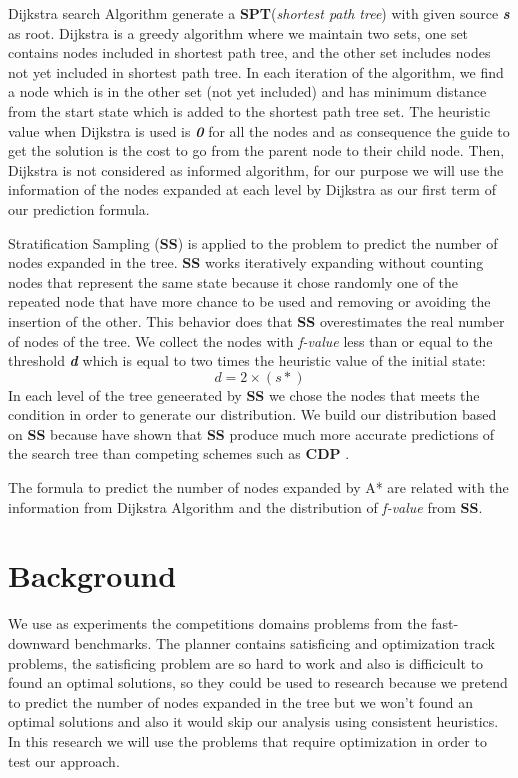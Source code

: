 \documentclass[11pt,a4paper,oneside]{report}
\begin{document}
Dijkstra search Algorithm generate a \textbf{SPT}(\textit{shortest path tree}) with given source \textbf{\textit{s}} as root. Dijkstra is a greedy algorithm where we maintain two sets, one set contains nodes included in shortest path tree, and the other set includes nodes not yet included in shortest path tree. In each iteration of the algorithm, we find a node which is in the other set (not yet included) and has minimum distance from the start state which is added to the shortest path tree set. The heuristic value when Dijkstra is used is \textbf{\textit{0}} for all the nodes and as consequence the guide to get the solution is the cost to go from the parent node to their child node. Then, Dijkstra is not considered as informed algorithm, for our purpose we will use the information of the nodes expanded at each level by Dijkstra as our first term of our prediction formula.
\newline

Stratification Sampling (\textbf{SS})  is applied to the problem to predict the number of nodes expanded in the tree. \textbf{SS} works iteratively expanding without counting nodes that represent the same state because it chose randomly one of the repeated node that have more chance to be used and removing or avoiding the insertion of the other. This behavior does that \textbf{SS} overestimates the real number of nodes of the tree. We collect the nodes with \textit{f-value} less than or equal to the threshold \textbf{\textit{d}} which is equal to two times the heuristic value of the initial state: 
\[ 
d =2 \times (s*)
\]
In each level of the tree geneerated by \textbf{SS} we chose the nodes that meets the condition in order to generate our distribution.  We build our distribution based on \textbf{SS} because \citep{lelis2013predicting} have shown that \textbf{SS} produce much more accurate predictions of the search tree than competing schemes such as \textbf{CDP} \citep{zahavi2010predicting}.
\newline

The formula to predict the number of nodes expanded by A* are  related with the information from Dijkstra Algorithm and the distribution of \textit{f-value} from \textbf{SS}.

\section{Background}
We use as experiments the competitions domains problems from the fast-downward benchmarks. The planner contains satisficing and optimization track problems, the satisficing problem are so hard to work and also is difficicult to found an optimal solutions, so they could be used to research because we pretend to predict the number of nodes expanded in the tree but we won't found an optimal solutions and also it would skip our analysis using consistent heuristics. In this research we will use the problems that require optimization in order to test our approach. 
\end{document}
